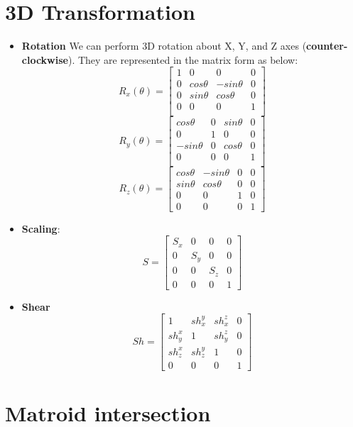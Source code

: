 \documentclass[a4paper]{article}
\begin{document}
\begin{landscape}
\begin{multicols}{2}
\section{3D Transformation}
\begin{itemize}
    \item \textbf{Rotation} We can perform 3D rotation about X, Y, and Z axes (\textbf{counter-clockwise}). They are represented in the matrix form as below:
    $$ R_{x}(\theta) = \begin{bmatrix}
 1& 0&  0& 0\\ 
 0&  cos\theta & -sin\theta& 0\\ 
 0&  sin\theta &  cos\theta& 0\\ 
 0& 0&  0& 1\\
\end{bmatrix}$$
$$R_{y}(\theta) = \begin{bmatrix}
 cos\theta& 0&  sin\theta& 0\\ 
 0&  1& 0& 0\\ 
 -sin\theta&  0&  cos\theta& 0\\ 
 0& 0&  0& 1\\
\end{bmatrix}$$
$$R_{z}(\theta) =\begin{bmatrix}
 cos\theta &  -sin\theta &  0& 0\\ 
 sin\theta &  cos\theta &  0& 0\\ 
 0& 0&  1& 0\\ 
 0&  0&  0& 1
\end{bmatrix}$$
    \item \textbf{Scaling}:
    $$ S = \begin{bmatrix}
 S_{x}&  0&  0& 0\\ 
 0&  S_{y}&  0& 0\\ 
 0& 0&  S_{z}& 0\\ 
 0&  0&  0& 1
\end{bmatrix}$$
    \item \textbf{Shear}
    $$Sh = \begin{bmatrix}
1 & sh_{x}^{y}  & sh_{x}^{z}  & 0 \\ 
sh_{y}^{x} & 1  & sh_{y}^{z}  & 0 \\ 
sh_{z}^{x} & sh_{z}^{y} & 1  & 0 \\ 
0 & 0 & 0 & 1 
\end{bmatrix}$$
\end{itemize}

\section{Matroid intersection}


\end{multicols}
\end{landscape}
\end{document}
